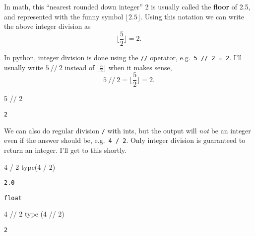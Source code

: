 \documentclass[
  letterpaper,
  DIV=11,
  numbers=noendperiod]{scrreprt}
\newenvironment{Shaded}{\begin{snugshade}}{\end{snugshade}}
\newcommand{\BuiltInTok}[1]{\textcolor[rgb]{0.00,0.23,0.31}{#1}}
\newcommand{\DecValTok}[1]{\textcolor[rgb]{0.68,0.00,0.00}{#1}}
\newcommand{\NormalTok}[1]{\textcolor[rgb]{0.00,0.23,0.31}{#1}}
\newcommand{\OperatorTok}[1]{\textcolor[rgb]{0.37,0.37,0.37}{#1}}
\begin{document}
In math, this ``nearest rounded down integer'' 2 is usually called the
\textbf{floor} of 2.5, and represented with the funny symbol
\(\lfloor 2.5 \rfloor.\) Using this notation we can write the above
integer division as \[\big\lfloor \frac{5}{2} \big\rfloor = 2.\]

In python, integer division is done using the \texttt{//} operator,
e.g.~\texttt{5\ //\ 2\ =\ 2}. I'll usually write \(5 \ // \ 2\) instead
of \(\big\lfloor \frac{5}{2} \big\rfloor\) when it makes sense,
\[5 \ // \ 2 = \big\lfloor \frac{5}{2} \big\rfloor = 2.\]

\begin{Shaded}
\begin{Highlighting}[]
\DecValTok{5} \OperatorTok{//} \DecValTok{2}
\end{Highlighting}
\end{Shaded}

\begin{verbatim}
2
\end{verbatim}

We can also do regular division \texttt{/} with ints, but the output
will \emph{not} be an integer even if the answer should be,
e.g.~\texttt{4\ /\ 2}. Only integer division is guaranteed to return an
integer. I'll get to this shortly.

\begin{Shaded}
\begin{Highlighting}[]
\DecValTok{4} \OperatorTok{/} \DecValTok{2}
\BuiltInTok{type}\NormalTok{(}\DecValTok{4} \OperatorTok{/} \DecValTok{2}\NormalTok{)}
\end{Highlighting}
\end{Shaded}

\begin{verbatim}
2.0
\end{verbatim}

\begin{verbatim}
float
\end{verbatim}

\begin{Shaded}
\begin{Highlighting}[]
\DecValTok{4} \OperatorTok{//} \DecValTok{2}
\BuiltInTok{type}\NormalTok{ (}\DecValTok{4} \OperatorTok{//} \DecValTok{2}\NormalTok{)}
\end{Highlighting}
\end{Shaded}

\begin{verbatim}
2
\end{verbatim}
\end{document}
